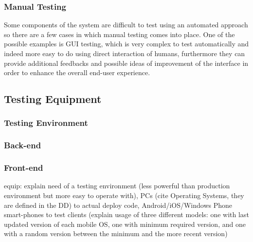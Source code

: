 \subsubsection{Manual Testing}
Some components of the system are difficult to test using an automated approach so there are a few cases in which manual testing comes into place. One of the possible examples is GUI testing, which is very complex to test automatically and indeed more easy to do using direct interaction of humans, furthermore they can provide additional feedbacks and possible ideas of improvement of the interface in order to enhance the overall end-user experience. 

\subsection{Testing Equipment}

\subsubsection{Testing Environment}

\subsubsection{Back-end}

\subsubsection{Front-end}

equip: explain need of a testing environment (less powerful than production environment but more easy to operate with), PCs (cite Operating Systems, they are defined in the DD) to actual deploy code, Android/iOS/Windows Phone smart-phones to test clients (explain usage of three different models: one with last updated version of each mobile OS, one with minimum required version, and one with a random version between the minimum and the more recent version)